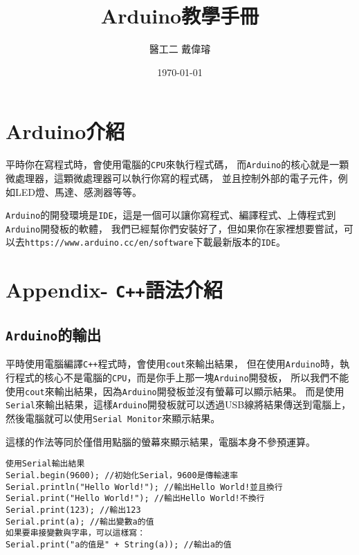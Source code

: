 \documentclass[12pt,a4paper]{article}
\title{Arduino教學手冊}
\author{醫工二 戴偉璿}
\date{\today}
\begin{document}
\maketitle

\newpage
\tableofcontents
\newpage

\newpage
\section{Arduino介紹}

平時你在寫程式時，會使用電腦的\texttt{CPU}來執行程式碼，
而\texttt{Arduino}的核心就是一顆微處理器，這顆微處理器可以執行你寫的程式碼，
並且控制外部的電子元件，例如LED燈、馬達、感測器等等。

\texttt{Arduino}的開發環境是\texttt{IDE}，這是一個可以讓你寫程式、編譯程式、上傳程式到\texttt{Arduino}開發板的軟體，
我們已經幫你們安裝好了，但如果你在家裡想要嘗試，可以去\texttt{https://www.arduino.cc/en/software}下載最新版本的\texttt{IDE}。



\newpage
\section{Appendix- \texttt{C++}語法介紹}

\subsection{\texttt{Arduino}的輸出}
平時使用電腦編譯\texttt{C++}程式時，會使用\texttt{cout}來輸出結果，
但在使用\texttt{Arduino}時，執行程式的核心不是電腦的\texttt{CPU}，而是你手上那一塊\texttt{Arduino}開發板，
所以我們不能使用\texttt{cout}來輸出結果，因為\texttt{Arduino}開發板並沒有螢幕可以顯示結果。
而是使用\texttt{Serial}來輸出結果，這樣\texttt{Arduino}開發板就可以透過USB線將結果傳送到電腦上，
然後電腦就可以使用\texttt{Serial Monitor}來顯示結果。

這樣的作法等同於僅借用點腦的螢幕來顯示結果，電腦本身不參預運算。

\begin{lstlisting}
使用Serial輸出結果
Serial.begin(9600); //初始化Serial，9600是傳輸速率
Serial.println("Hello World!"); //輸出Hello World!並且換行
Serial.print("Hello World!"); //輸出Hello World!不換行
Serial.print(123); //輸出123
Serial.print(a); //輸出變數a的值
如果要串接變數與字串，可以這樣寫：
Serial.print("a的值是" + String(a)); //輸出a的值
\end{lstlisting}
\end{document}
